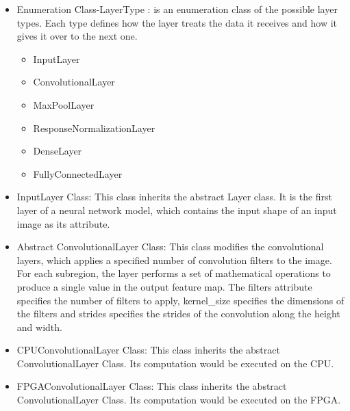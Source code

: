 \documentclass[parskip=full]{scrartcl}
\begin{document}
\pagebreak



\begin{itemize}
	\item Enumeration Class-LayerType : is an enumeration class of the possible layer types. Each type defines how the layer treats the data it receives and how it gives it over to the next one.
	\begin{itemize}
		\item InputLayer
		\item ConvolutionalLayer
		\item MaxPoolLayer
		\item ResponseNormalizationLayer
		\item DenseLayer
		\item FullyConnectedLayer
	\end{itemize}
\end{itemize}

\pagebreak

\begin{itemize}
	\item InputLayer Class: This class inherits the abstract Layer class. It is the first layer of a neural network model, which contains the input shape of an input image as its attribute.
	\item Abstract ConvolutionalLayer Class: This class modifies the convolutional layers, which applies a specified number of convolution filters to the image. For each subregion, the layer performs a set of mathematical operations to produce a single value in the output feature map. 
The filters attribute specifies the number of filters to apply, kernel\_size specifies the dimensions of the filters and strides specifies the strides of the convolution along the height and width.
	\item CPUConvolutionalLayer Class: This class inherits the abstract ConvolutionalLayer Class. Its computation would be executed on the CPU. 
	\item FPGAConvolutionalLayer Class: This class inherits the abstract ConvolutionalLayer Class. Its computation would be executed on the FPGA. 
\end{itemize}



\pagebreak
\end{document}
